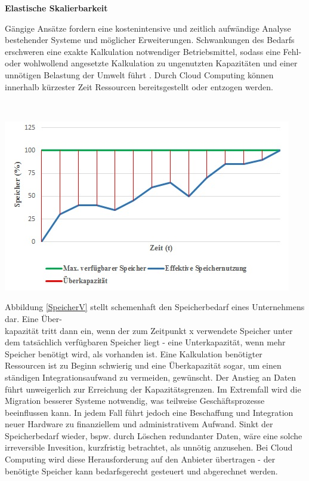 \documentclass[13pt,a4paper,bibliography=totocnumbered,listof=totocnumbered]{scrartcl}
\begin{document}
\textbf{Elastische Skalierbarkeit}

Gängige Ansätze fordern eine kostenintensive und zeitlich aufwändige Analyse bestehender Systeme und möglicher Erweiterungen. Schwankungen des Bedarfs erschweren eine exakte Kalkulation notwendiger Betriebsmittel, sodass eine Fehl- oder wohlwollend angesetzte Kalkulation zu ungenutzten Kapazitäten und einer unnötigen Belastung der Umwelt führt \cite[S. 91 ff.]{45}. Durch Cloud Computing können innerhalb kürzester Zeit Ressourcen bereitsgestellt oder entzogen werden.

\vspace{1em}
$\;$\\
\begin{minipage}{\linewidth}
	\centering
	\includegraphics[width=1.0\linewidth]{./img/Speicher.jpg}
 	\label{SpeicherV}
\end{minipage}
\vspace{1em}

Abbildung \ref{SpeicherV} stellt schemenhaft den Speicherbedarf eines Unternehmens dar. Eine Über-\\kapazität tritt dann ein, wenn der zum Zeitpunkt x verwendete Speicher unter dem tatsächlich verfügbaren Speicher liegt - eine Unterkapazität, wenn mehr Speicher benötigt wird, als vorhanden ist. Eine Kalkulation benötigter Ressourcen ist zu Beginn schwierig und eine Überkapazität sogar, um einen ständigen Integrationsaufwand zu vermeiden, gewünscht. Der Anstieg an Daten führt unweigerlich zur Erreichung der Kapazitätsgrenzen. Im Extremfall wird die Migration besserer Systeme notwendig, was teilweise Geschäftsprozesse beeinflussen kann. In jedem Fall führt jedoch eine Beschaffung und Integration neuer Hardware zu finanziellem und administrativem Aufwand. Sinkt der Speicherbedarf wieder, bspw. durch Löschen redundanter Daten, wäre eine solche irreversible Invesition, kurzfristig betrachtet, als unnötig anzusehen. Bei Cloud Computing wird diese Herausforderung auf den Anbieter übertragen - der benötigte Speicher kann bedarfsgerecht gesteuert und abgerechnet werden.
\end{document}
